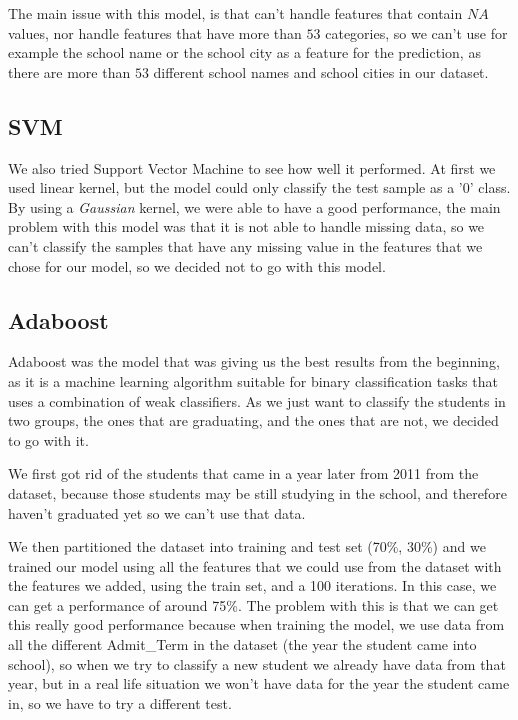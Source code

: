 \documentclass{article}
\begin{document}
The main issue with this model, is that can't handle features that contain $NA$ values, nor handle features that have more than $53$ categories, so we can't use for example the school name or the school city as a feature for the prediction, as there are more than $53$ different school names and school cities in our dataset.

\subsection*{SVM}

We also tried Support Vector Machine to see how well it performed. At first we used linear kernel, but the model could only classify the test sample as a '0' class. By using a \textit{Gaussian} kernel, we were able to have a good performance, the main problem with this model was that it is not able to handle missing data, so we can't classify the samples that have any missing value in the features that we chose for our model, so we decided not to go with this model.

\subsection*{Adaboost}

Adaboost was the model that was giving us the best results from the beginning, as it is a machine learning algorithm suitable for binary classification tasks that uses a combination of weak classifiers. As we just want to classify the students in two groups, the ones that are graduating, and the ones that are not, we decided to go with it. 

We first got rid of the students that came in a year later from 2011 from the dataset, because those students may be still studying in the school, and therefore haven't graduated yet so we can't use that data. 

We then partitioned the dataset into training and test set (70\%, 30\%) and we trained our model using all the features that we could use from the dataset with the features we added, using the train set, and a 100 iterations. In this case, we can get a performance of around 75\%. The problem with this is that we can get this really good performance because when training the model, we use data from all the different Admit\_Term in the dataset (the year the student came into school), so when we try to classify a new student we already have data from that year, but in a real life situation we won't have data for the year the student came in, so we have to try a different test.
\end{document}
